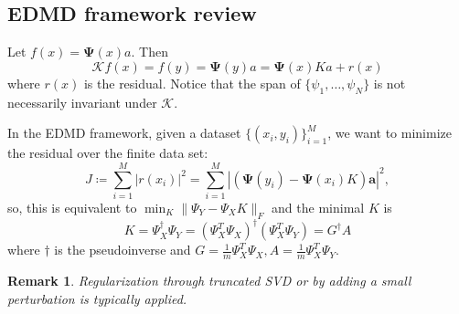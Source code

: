 \documentclass{article}[11]
\newtheorem*{remark}{Remark}
\begin{document}
	\subsection*{EDMD framework review}
	Let $f(x) = \mathbf{\Psi}(x)a$. Then 
	$$\mathcal{K} f(x) = f(y) = \mathbf{\Psi}(y)a = \mathbf{\Psi}(x)K a + r(x)$$
	where $r(x)$ is the residual. Notice that the span of $\{ \psi_1, \dots, \psi_N \}$ is not necessarily invariant under $\mathcal{K}$.
	
	In the EDMD framework, given a dataset $\{(x_i,y_i)\}_{i=1}^M$, we want to minimize the residual over the finite data set:
	$$J \coloneqq \sum_{i=1}^M \left| r(x_i) \right|^2 = \sum_{i=1}^M \left| \left(\mathbf{\Psi}(y_i) - \mathbf{\Psi}(x_i)K\right)\mathbf{a} \right|^2,$$
	so, this is equivalent to $\min_{K} \| \Psi_Y - \Psi_X K\|_F$ and the minimal $K$ is
	$$K = \Psi_X^{\dagger}\Psi_Y = (\Psi_X^T\Psi_X)^{\dagger}(\Psi_X^T\Psi_Y) = G^{\dagger}A$$
	where $\dagger$ is the pseudoinverse and $G=\frac{1}{m}\Psi_X^T\Psi_X, A=\frac{1}{m}\Psi_X^T\Psi_Y$. 
	\begin{remark}
		Regularization through truncated SVD or by adding a small perturbation is typically applied.
	\end{remark}
	
\end{document}
